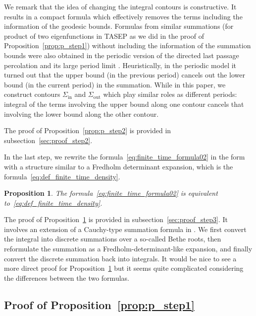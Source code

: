 \documentclass{article}
\newtheorem{prop}[thm]{Proposition}
\numberwithin{equation}{section}
\newcommand{\inn}{\mathrm{in}}
\newcommand{\out}{\mathrm{out}}
\begin{document}
We remark that the idea of changing the integral contours is constructive. It results in a compact formula which effectively removes the terms including the information of the geodesic bounds. Formulas from similar summations (for product of two eigenfunctions in TASEP as we did in the proof of Proposition~\ref{prop:p_step1}) without including the information of the summation bounds were also obtained in the periodic version of the directed last passage percolation \cite{Baik-Liu16,Baik-Liu17,Baik-Liu21} and its large period limit \cite{Liu19}. Heuristically, in the periodic model it turned out that the upper bound (in the previous period) cancels out the lower bound (in the current period) in the summation. While in this paper, we construct contours $\Sigma_\inn$ and $\Sigma_\out$ which play similar roles as different periods: integral of the terms involving the upper bound along one contour cancels that involving the lower bound along the other contour.

The proof of Proposition~\ref{prop:p_step2} is provided in subsection~\ref{sec:proof_step2}.


\bigskip

In the last step, we rewrite the formula~\eqref{eq:finite_time_formula02} in the form with a structure similar to a Fredholm determinant expansion, which is the formula~\eqref{eq:def_finite_time_density}.

\begin{prop}
	\label{prop:p_step3}
	The formula~\eqref{eq:finite_time_formula02} is equivalent to~\eqref{eq:def_finite_time_density}.
\end{prop} 

The proof of Proposition~\ref{prop:p_step3}  is provided in subsection~\ref{sec:proof_step3}. It involves an extension of a Cauchy-type summation formula in \cite{Liu19}. We first convert the integral into discrete summations over a so-called Bethe roots, then reformulate the summation as a Fredholm-determinant-like expansion, and finally convert the discrete summation back into integrals. It would be nice to see a more direct proof for Proposition~\ref{prop:p_step3} but it seems quite complicated considering the differences between the two formulas.



\subsection{Proof of Proposition~\ref{prop:p_step1}}
\label{sec:proof_step1}
\end{document}
